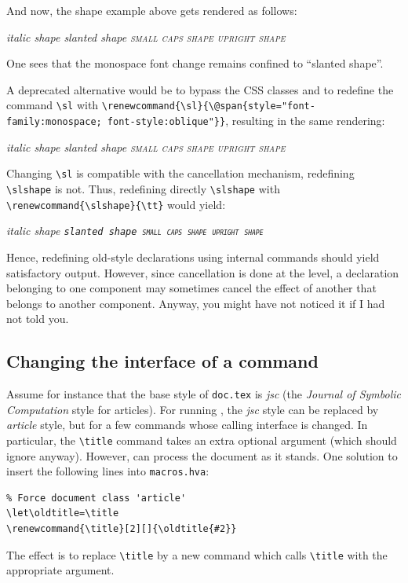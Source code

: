 \begin{htmlonly}
And now, the shape example above gets rendered as follows:
\begin{htmlout}
{\itshape italic shape \slshape slanted shape
\scshape small caps shape \upshape upright shape}
\end{htmlout}
One sees that the monospace font change remains confined to ``slanted shape''.

A deprecated alternative would be to bypass the CSS classes and to
redefine the command \verb+\sl+ with
\verb+\renewcommand{\sl}{\@span{style="font-family:monospace; font-style:oblique"}}+, resulting in the same rendering:
\begin{htmlout}
\renewcommand{\sl}{\@span{style="font-family:monospace; font-style:oblique"}}
{\itshape italic shape \slshape slanted shape
\scshape small caps shape \upshape upright shape}
\end{htmlout}

Changing \verb+\sl+ is compatible with the cancellation
mechanism, redefining \verb+\slshape+ is not.
Thus, redefining directly \LaTeXe{} \verb+\slshape+ with
\verb+\renewcommand{\slshape}{\tt}+ would yield:
\begin{htmlout}\renewcommand{\slshape}{\tt}
{\itshape italic shape \slshape slanted shape
\scshape small caps shape \upshape upright shape}
\end{htmlout}
\end{htmlonly}

Hence, redefining old-style declarations using internal commands
should yield satisfactory output.
However, since cancellation is done at the \html{}
level, a declaration belonging to one component may sometimes cancel the
effect of another that belongs to another component.
Anyway, you might have not noticed it if I had not told you.

\subsection{Changing the interface of a command}\label{customize-let}
Assume for instance that the base style of \texttt{doc.tex} is
\textit{jsc} (the
\emph{Journal of Symbolic Computation} style for articles).
For running \hevea{}, the \textit{jsc} style can be replaced by
\textit{article}
style, but for a few commands whose calling interface is changed.
In particular, the \verb+\title+ command
takes an extra optional argument (which \hevea{} should ignore
anyway).
However, \hevea{} can process the document as it stands.
One  solution to insert the following lines into \texttt{macros.hva}:
\begin{verbatim}
% Force document class 'article'
\let\oldtitle=\title
\renewcommand{\title}[2][]{\oldtitle{#2}}
\end{verbatim}
The effect is to replace \verb+\title+ by a new command which
calls \hevea{} \verb+\title+ with the appropriate argument.
